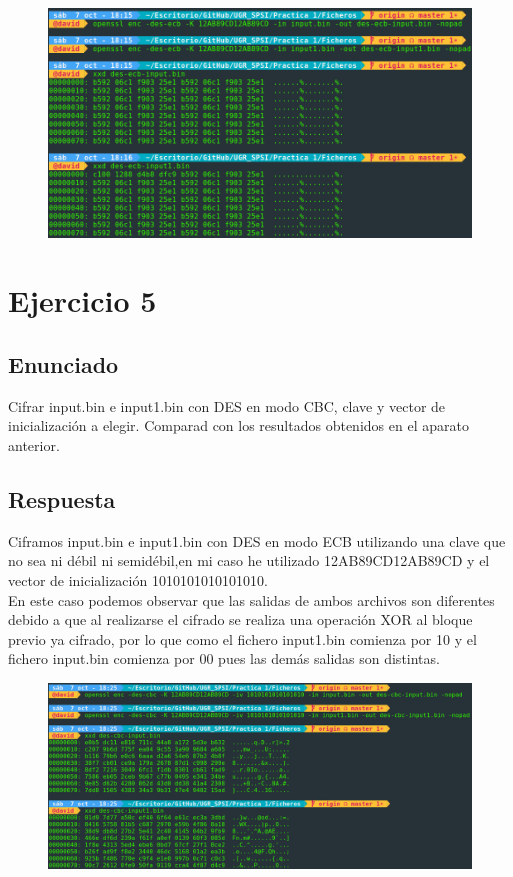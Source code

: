 \documentclass[10pt,a4paper,spanish]{report}
\begin{document}
\begin{figure}[!hbp]
 \centering  \includegraphics[width=1\textwidth]{./Imagenes/8.png}
\end{figure}


\chapter{Ejercicio 5}

\section{Enunciado}
\noindent
Cifrar input.bin e input1.bin con DES en modo CBC, clave y vector de inicialización a elegir. Comparad con los resultados obtenidos en el aparato anterior.

\section{Respuesta}
\noindent
Ciframos input.bin e input1.bin con DES en modo ECB utilizando una clave que no sea ni débil ni semidébil,en mi caso he utilizado 12AB89CD12AB89CD y el vector de inicialización 1010101010101010. \\

\noindent
En este caso podemos observar que las salidas de ambos archivos son diferentes debido a que al realizarse el cifrado se realiza una operación XOR al bloque previo ya cifrado, por lo que como el fichero input1.bin comienza por 10 y el fichero input.bin comienza por 00 pues las demás salidas son distintas.

\begin{figure}[!hbp]
 \centering  \includegraphics[width=1\textwidth]{./Imagenes/9.png}
\end{figure}
\end{document}
